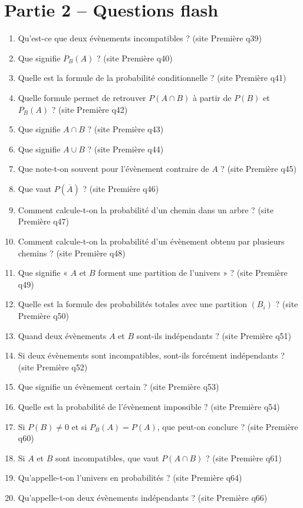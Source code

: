 \documentclass[11pt,a4paper]{article}
\newcommand{\sourceq}[1]{ {\scriptsize\textcolor{bleufonce}{(site Première q#1)}}}
\newcounter{question}
\newenvironment{blocquestions}[1]{%
  \begin{tcolorbox}[enhanced,breakable,colback=bleuclair,colframe=bleufonce,boxrule=0.6pt,arc=2mm,left=2mm,right=2mm,top=2mm,bottom=1.5mm,title={\bfseries #1},coltitle=white,colbacktitle=bleufonce,before skip=3mm,after skip=3mm, fontupper=\large]
  \large
  \begin{enumerate}[leftmargin=*,label=\textbf{\arabic*.},itemsep=0.85em,topsep=0.5em]
  \setcounter{enumi}{\value{question}}
}{%
  \setcounter{question}{\value{enumi}}
  \end{enumerate}
  \end{tcolorbox}
}
\begin{document}
\section*{Partie 2 -- Questions flash}
\setcounter{question}{0}
\begin{blocquestions}{Questions flash -- Probabilités conditionnelles}
  \item Qu'est-ce que deux évènements incompatibles ? \sourceq{39}
  \item Que signifie $P_B(A)$ ? \sourceq{40}
  \item Quelle est la formule de la probabilité conditionnelle ? \sourceq{41}
  \item Quelle formule permet de retrouver $P(A\cap B)$ à partir de $P(B)$ et $P_B(A)$ ? \sourceq{42}
  \item Que signifie $A\cap B$ ? \sourceq{43}
  \item Que signifie $A\cup B$ ? \sourceq{44}
  \item Que note-t-on souvent pour l'évènement contraire de $A$ ? \sourceq{45}
  \item Que vaut $P(\overline A)$ ? \sourceq{46}
  \item Comment calcule-t-on la probabilité d'un chemin dans un arbre ? \sourceq{47}
  \item Comment calcule-t-on la probabilité d'un évènement obtenu par plusieurs chemins ? \sourceq{48}
  \item Que signifie « $A$ et $B$ forment une partition de l'univers » ? \sourceq{49}
  \item Quelle est la formule des probabilités totales avec une partition $(B_i)$ ? \sourceq{50}
  \item Quand deux évènements $A$ et $B$ sont-ils indépendants ? \sourceq{51}
  \item Si deux évènements sont incompatibles, sont-ils forcément indépendants ? \sourceq{52}
  \item Que signifie un évènement certain ? \sourceq{53}
  \item Quelle est la probabilité de l'évènement impossible ? \sourceq{54}
  \item Si $P(B)\neq0$ et si $P_B(A)=P(A)$, que peut-on conclure ? \sourceq{60}
  \item Si $A$ et $B$ sont incompatibles, que vaut $P(A\cap B)$ ? \sourceq{61}
  \item Qu'appelle-t-on l'univers en probabilités ? \sourceq{64}
  \item Qu'appelle-t-on deux évènements indépendants ? \sourceq{66}

\end{blocquestions}
\end{document}
